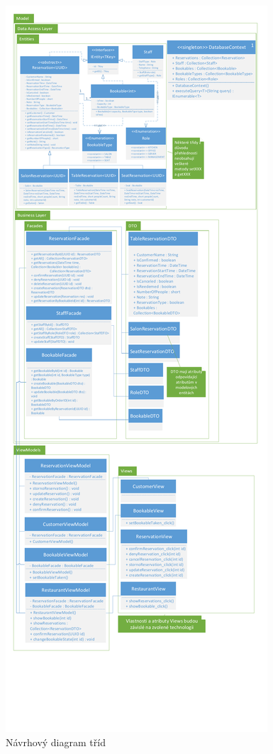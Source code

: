 \newpage
\begin{figure}[h!]
\begin{center}
\includegraphics[scale=0.5]{../02_Vysledne_modely/07_1_ClassDiagram.pdf}
\vspace{150pt}
\caption{Návrhový diagram tříd}
\label{fig:communication09-1}
\end{center}
\end{figure}

